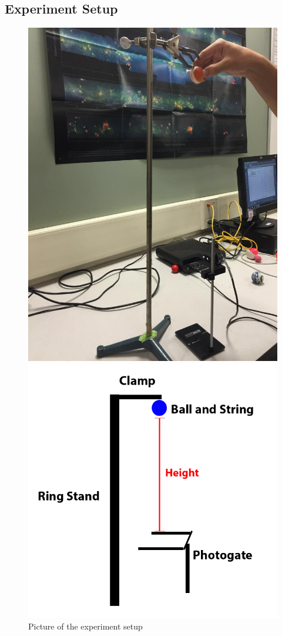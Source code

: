 \documentclass[10pt, letterpaper]{article}
\begin{document}
    \subsection{Experiment Setup}
    \begin{figure}[!htb]
      \centering
      \parbox{2.75in} {
        \includegraphics[scale=0.233]{img/setup.jpg}
        \caption{Picture of the experiment setup}
      }
      \begin{minipage}{2.75in}
        \includegraphics[scale=0.7]{img/apparatus.png}

\end{minipage}
\end{figure}
\end{document}

